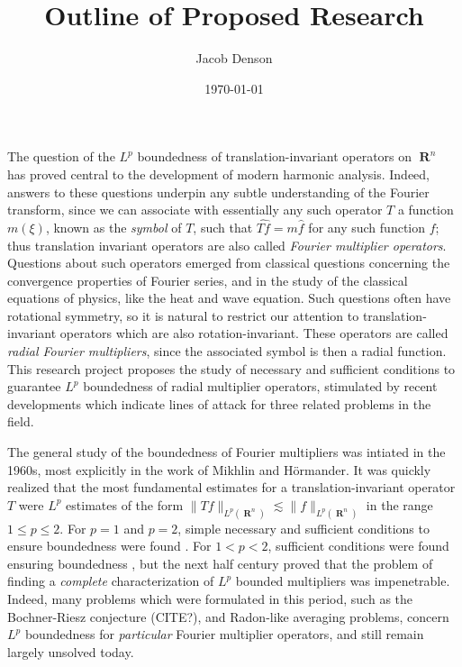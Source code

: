 \documentclass[12pt]{article}
\title{Outline of Proposed Research}
\author{Jacob Denson}
\date{\today}
\DeclareMathOperator{\RR}{\mathbf{R}}
\theoremstyle{plain}
\theoremstyle{remark}
\theoremstyle{definition}
\begin{document}
\maketitle

The question of the $L^p$ boundedness of translation-invariant operators on $\RR^n$ has proved central to the development of modern harmonic analysis. 
Indeed, answers to these questions underpin any subtle understanding of the Fourier transform, since we can associate with essentially any such operator $T$ a function $m(\xi)$, known as the \emph{symbol} of $T$, such that $\widehat{Tf} = m \widehat{f}$ for any such function $f$; thus translation invariant operators are also called \emph{Fourier multiplier operators}. Questions about such operators emerged from classical questions concerning the convergence properties of Fourier series, and in the study of the classical equations of physics, like the heat and wave equation. Such questions often have rotational symmetry, so it is natural to restrict our attention to translation-invariant operators which are also rotation-invariant. These operators are called \emph{radial Fourier multipliers}, since the associated symbol is then a radial function. This research project proposes the study of necessary and sufficient conditions to guarantee $L^p$ boundedness of radial multiplier operators, stimulated by recent developments which indicate lines of attack for three related problems in the field.

The general study of the boundedness of Fourier multipliers was intiated in the 1960s, most explicitly in the work of Mikhlin and H\"{o}rmander. It was quickly realized that the most fundamental estimates for a translation-invariant operator $T$ were $L^p$ estimates of the form $\| Tf \|_{L^p(\RR^n)} \lesssim \| f \|_{L^p(\RR^n)}$ in the range $1 \leq p \leq 2$. For $p = 1$ and $p = 2$, simple necessary and sufficient conditions to ensure boundedness were found \cite{Hormander1}. For $1 < p < 2$, sufficient conditions were found ensuring boundedness \cite{Mikhlin}, but the next half century proved that the problem of finding a \emph{complete} characterization of $L^p$ bounded multipliers was impenetrable. Indeed, many problems which were formulated in this period, such as the Bochner-Riesz conjecture (CITE?), and Radon-like averaging problems, concern $L^p$ boundedness for \emph{particular} Fourier multiplier operators, and still remain largely unsolved today.
\end{document}

